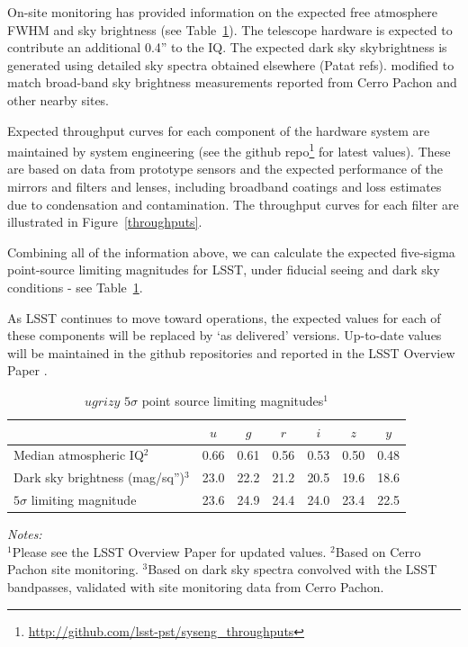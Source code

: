\documentclass{iau}
\begin{document}
On-site monitoring has provided information on the expected free
atmosphere FWHM and sky brightness (see Table~\ref{table2}). The
telescope hardware is expected to contribute an additional 0.4'' to
the IQ. The expected dark sky skybrightness is generated using
detailed sky spectra obtained elsewhere (Patat refs). modified to
match broad-band sky brightness measurements reported from Cerro
Pachon and other nearby sites.

Expected throughput curves for each component of the hardware system
are maintained by system engineering (see the github
repo\footnote{\url{http://github.com/lsst-pst/syseng_throughputs}} for
latest values).  These are based on data from prototype sensors and
the expected performance of the mirrors and filters and lenses,
including broadband coatings and loss estimates due to condensation
and contamination. The throughput curves for each filter are
illustrated in Figure~\ref{throughputs}.

Combining all of the information above, we can calculate the
expected five-sigma point-source limiting magnitudes for LSST, under
fiducial seeing and dark sky conditions - see Table~\ref{table2}.

As LSST continues to move toward operations, the expected values for each
of these components will be replaced by `as delivered'
versions. Up-to-date values will be maintained in the github
repositories and reported in the LSST Overview Paper \cite{overviewpaper}.

\begin{table}[tbh]
\begin{center}
\caption{$ugrizy$ $5\sigma$ point source limiting magnitudes$^1$}
\label{table2}
 {\scriptsize
  \begin{tabular}{|l|c|c|c|c|c|c|}\hline
 & $u$ & $g$ & $r$ & $i$ & $z$ & $y$ \\ \hline
Median atmospheric IQ$^2$  & 0.66 & 0.61 & 0.56 & 0.53 & 0.50 & 0.48 \\
    \hline
Dark sky brightness (mag/sq'')$^3$ & 23.0 & 22.2 &  21.2 & 20.5 & 19.6 & 18.6
    \\ \hline
$5\sigma$ limiting magnitude & 23.6 & 24.9 & 24.4 & 24.0 & 23.4 & 22.5
    \\ \hline
 \end{tabular}
  }
 \end{center}
\vspace{1mm}
 \scriptsize{
 {\it Notes:}\\
  $^1$Please see the LSST Overview Paper \cite{overviewpaper} for
  updated values.
  $^2$Based on Cerro Pachon site monitoring.
  $^3$Based on dark sky spectra convolved with the LSST bandpasses,
  validated with site monitoring data from Cerro Pachon.}
\end{table}
\end{document}

